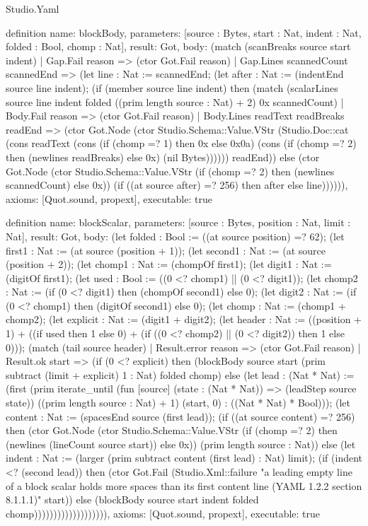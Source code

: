 \begin{lexlean}{Studio.Yaml}
\begin{semanticmodule}
definition{
  name: blockBody,
  parameters: [source : Bytes, start : Nat, indent : Nat, folded : Bool, chomp : Nat],
  result: Got,
  body: (match (scanBreaks source start indent)
    | Gap.Fail reason => (ctor Got.Fail reason)
    | Gap.Lines scannedCount scannedEnd => (let line : Nat := scannedEnd; (let after : Nat := (indentEnd source line indent); (if (member source line indent) then (match (scalarLines source line indent folded ((prim length source : Nat) + 2) 0x scannedCount)
      | Body.Fail reason => (ctor Got.Fail reason)
      | Body.Lines readText readBreaks readEnd => (ctor Got.Node (ctor Studio.Schema::Value.VStr (Studio.Doc::cat (cons readText (cons (if (chomp =? 1) then 0x else 0x0a) (cons (if (chomp =? 2) then (newlines readBreaks) else 0x) (nil Bytes)))))) readEnd)) else (ctor Got.Node (ctor Studio.Schema::Value.VStr (if (chomp =? 2) then (newlines scannedCount) else 0x)) (if ((at source after) =? 256) then after else line)))))),
  axioms: [Quot.sound, propext],
  executable: true
}

definition{
  name: blockScalar,
  parameters: [source : Bytes, position : Nat, limit : Nat],
  result: Got,
  body: (let folded : Bool := ((at source position) =? 62); (let first1 : Nat := (at source (position + 1)); (let second1 : Nat := (at source (position + 2)); (let chomp1 : Nat := (chompOf first1); (let digit1 : Nat := (digitOf first1); (let used : Bool := ((0 <? chomp1) || (0 <? digit1)); (let chomp2 : Nat := (if (0 <? digit1) then (chompOf second1) else 0); (let digit2 : Nat := (if (0 <? chomp1) then (digitOf second1) else 0); (let chomp : Nat := (chomp1 + chomp2); (let explicit : Nat := (digit1 + digit2); (let header : Nat := ((position + 1) + ((if used then 1 else 0) + (if ((0 <? chomp2) || (0 <? digit2)) then 1 else 0))); (match (tail source header)
    | Result.error reason => (ctor Got.Fail reason)
    | Result.ok start => (if (0 <? explicit) then (blockBody source start (prim subtract (limit + explicit) 1 : Nat) folded chomp) else (let lead : (Nat * Nat) := (first (prim iterate_until (fun [source] (state : (Nat * Nat)) => (leadStep source state)) ((prim length source : Nat) + 1) (start, 0) : ((Nat * Nat) * Bool))); (let content : Nat := (spacesEnd source (first lead)); (if ((at source content) =? 256) then (ctor Got.Node (ctor Studio.Schema::Value.VStr (if (chomp =? 2) then (newlines (lineCount source start)) else 0x)) (prim length source : Nat)) else (let indent : Nat := (larger (prim subtract content (first lead) : Nat) limit); (if (indent <? (second lead)) then (ctor Got.Fail (Studio.Xml::failure "a leading empty line of a block scalar holds more spaces than its first content line (YAML 1.2.2 section 8.1.1.1)" start)) else (blockBody source start indent folded chomp))))))))))))))))))),
  axioms: [Quot.sound, propext],
  executable: true
}


\end{semanticmodule}
\end{lexlean}
